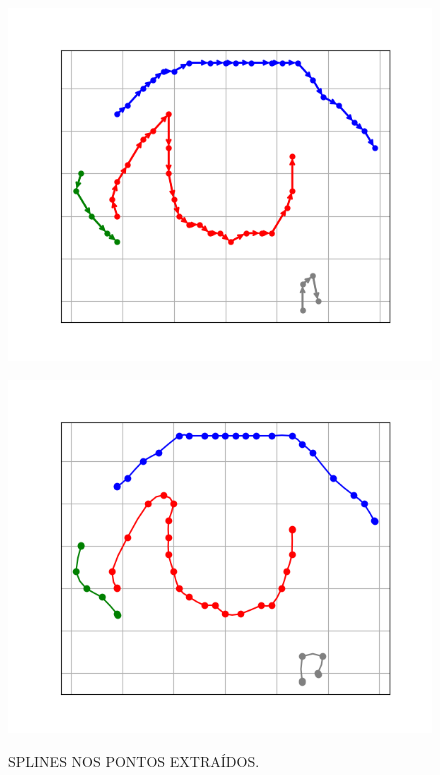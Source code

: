 \begin{figure}[h!]
    \caption{SPLINES NOS PONTOS EXTRAÍDOS.}
    \centering
    \begin{minipage}[b]{0.45\textwidth}
        \centering
        \includegraphics[width=1\linewidth]{fig/07_sorted_points_right_eye.png}
        \label{fig:reordenacao}
    \end{minipage}
    \hfill
    \begin{minipage}[b]{0.45\textwidth}
        \centering
        \includegraphics[width=1\linewidth]{fig/08_spline_plot_right_eye.png}
        \label{fig:spline}
    \end{minipage}
\end{figure}